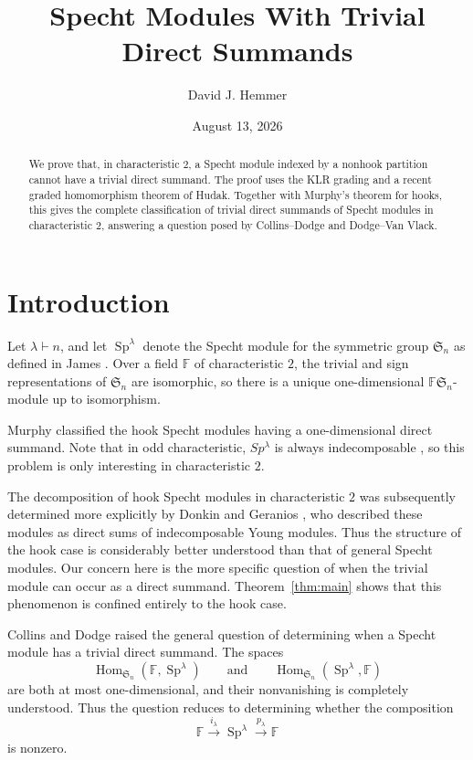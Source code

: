 \documentclass[11pt,reqno]{amsart}
\title[Specht Modules With Trivial Direct Summands]{Specht Modules With Trivial Direct Summands}
\author{David J. Hemmer}
\date{August 13, 2026}
\numberwithin{equation}{section}
\theoremstyle{remark}
\newcommand{\F}{\mathbb F}
\newcommand{\Sn}{\mathfrak S_n}
\newcommand{\Hom}{\operatorname{Hom}}
\newcommand{\JSp}{\operatorname{Sp}}
\begin{document}
\begin{abstract}
We prove that, in characteristic $2$, a Specht module indexed by a nonhook partition cannot have a trivial direct summand.  The proof uses the KLR grading and a recent graded homomorphism theorem of Hudak.  Together with Murphy's theorem for hooks, this gives the complete classification of trivial direct summands of Specht modules in characteristic $2$, answering a question posed by Collins--Dodge and Dodge--Van Vlack.
\end{abstract}

\maketitle

\section{Introduction}

Let $\lambda\vdash n$, and let $\JSp^\lambda$ denote the Specht module for the symmetric group $\Sn$ as defined in James \cite{James}.  Over a field $\F$ of characteristic $2$, the trivial and sign representations of $\Sn$ are isomorphic, so there is a unique one-dimensional $\F\Sn$-module up to isomorphism.

Murphy \cite{Murphy} classified the hook Specht modules having a one-dimensional direct summand.  Note that in odd characteristic, $Sp^\lambda$ is always indecomposable \cite{James}, so this problem is only interesting in characteristic $2$. 

The decomposition of hook Specht modules in characteristic $2$ was subsequently determined more explicitly by Donkin and Geranios \cite{DonkinGeranios}, who described these modules as direct sums of indecomposable Young modules.  Thus the structure of the hook case is considerably better understood than that of general Specht modules.  Our concern here is the more specific question of when the trivial module can occur as a direct summand.  Theorem~\ref{thm:main} shows that this phenomenon is confined entirely to the hook case.


Collins and Dodge \cite{CollinsDodge} raised the general question of determining when a Specht module has a trivial direct summand.  The spaces
\[
\Hom_{\Sn}(\F,\JSp^\lambda)
\qquad\text{and}\qquad
\Hom_{\Sn}(\JSp^\lambda,\F)
\]
are both at most one-dimensional, and their nonvanishing is completely understood.  Thus the question reduces to determining whether the composition
\[
\F \xrightarrow{i_\lambda} \JSp^\lambda
\xrightarrow{p_\lambda} \F
\]
is nonzero.
\end{document}
